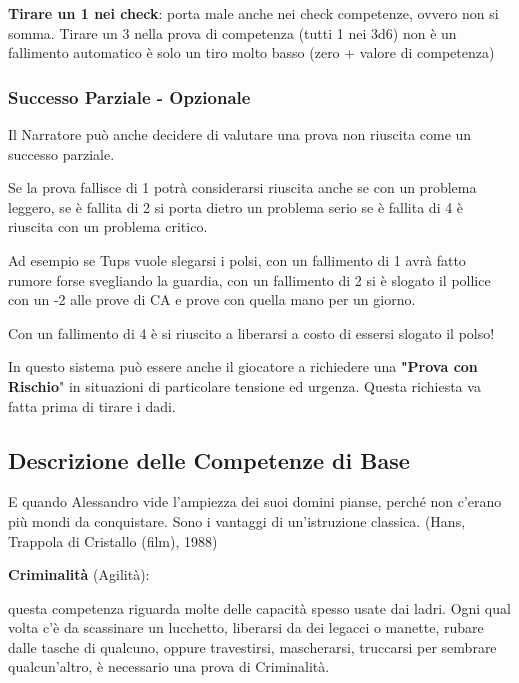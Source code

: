 \documentclass[a4paper,11pt,twoside,openany]{book}
\begin{document}
\textbf{Tirare un 1 nei check}: porta male anche nei check competenze, ovvero non si somma.
Tirare un 3 nella prova di competenza (tutti 1 nei 3d6) non è un fallimento automatico è solo un tiro molto basso (zero + valore di competenza)

\subsubsection{Successo Parziale - Opzionale}

Il Narratore può anche decidere di valutare una prova non riuscita come un successo parziale.

Se la prova fallisce di 1 potrà considerarsi riuscita anche se con un problema leggero, se è fallita di 2 si porta dietro un problema serio se è fallita di 4 è riuscita con un problema critico.

Ad esempio se Tups vuole slegarsi i polsi, con un fallimento di 1 avrà fatto rumore forse svegliando la guardia, con un fallimento di 2 si è slogato il pollice con un -2 alle prove di CA e prove con quella mano per un giorno.

Con un fallimento di 4 è si riuscito a liberarsi a costo di essersi slogato il polso!


\begin{note}
In questo sistema può essere anche il giocatore a richiedere una \textbf{"Prova con Rischio}" in situazioni di particolare tensione ed urgenza. Questa richiesta va fatta prima di tirare i dadi.
\end{note}

\pagebreak

\subsection{Descrizione delle Competenze di Base}

\label{descrizione-delle-competenze-di-base}
\begin{tcolorbox}[enhanced,arc=5pt,boxrule=0.3pt]{
		E quando Alessandro vide l'ampiezza dei suoi domini pianse, perché non c'erano più mondi da conquistare. Sono i vantaggi di un'istruzione classica. (Hans, Trappola di Cristallo (film), 1988)
	}\end{tcolorbox}\medskip

\textbf{Criminalità} (Agilità):

questa competenza riguarda molte delle capacità spesso usate dai ladri. Ogni qual volta c'è da scassinare un lucchetto, liberarsi da dei legacci o manette, rubare dalle tasche di qualcuno, oppure travestirsi, mascherarsi, truccarsi per sembrare qualcun'altro, è necessario una prova di Criminalità.
\end{document}
